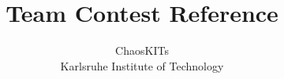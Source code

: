 \documentclass{article}
\title{Team Contest Reference}
\author{ChaosKITs \\ Karlsruhe Institute of Technology}
\begin{document}
\maketitle
\setlength{\columnsep}{1cm}
\begin{multicols}{3}
	\tableofcontents
\end{multicols}
\newpage

\begin{multicols}{2}
  
  
  
  
  
  
  
\end{multicols}
\end{document}
